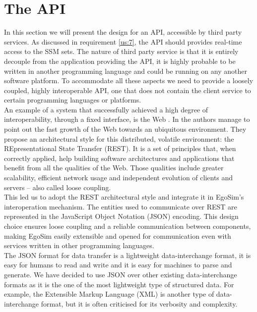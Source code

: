 \section{The API} %
\label{sec:api}
In this section we will present the design for an API, accessible by third party services. As discussed in requirement \ref{us:7}, the API should provides real-time access to the SSM sets. The nature of third party service is that it is entirely decouple from the application providing the API, it is highly probable to be written in another programming language and could be running on any another software platform. To accommodate all these aspects we need to provide a loosely coupled, highly interoperable API, one that does not contain the client service to certain programming languages or platforms.\\

An example of a system that successfully achieved a high degree of interoperability, through a fixed interface, is the Web \cite{coulouris2005distributed}. In \cite{kindberg2001web} the authors manage to point out the fast growth of the Web towards an ubiquitous environment. They propose an architectural style for this distributed, volatile environment: the REpresentational State Transfer (REST). It is a set of principles that, when correctly applied, help building software architectures and applications that benefit from all the qualities of the Web. Those qualities include greater scalability, efficient network usage and independent evolution of clients and servers -- also called loose coupling.\\

This led us to adopt the REST architectural style and integrate it in EgoSim's interoperation mechanism. The entities used to communicate over REST are represented in the JavaScript Object Notation (JSON) encoding. This design choice ensures loose coupling and a reliable communication between components, making EgoSim easily extensible and opened for communication even with services written in other programming languages.\\

The JSON format for data transfer is a lightweight data-interchange format, it is easy for humans to read and write and it is easy for machines to parse and generate. We have decided to use JSON over other existing data-interchange formats as it is the one of the most lightweight type of structured data. For example, the Extensible Markup Language (XML) is another type of data-interchange format, but it is often criticised for its verbosity and complexity.\\


